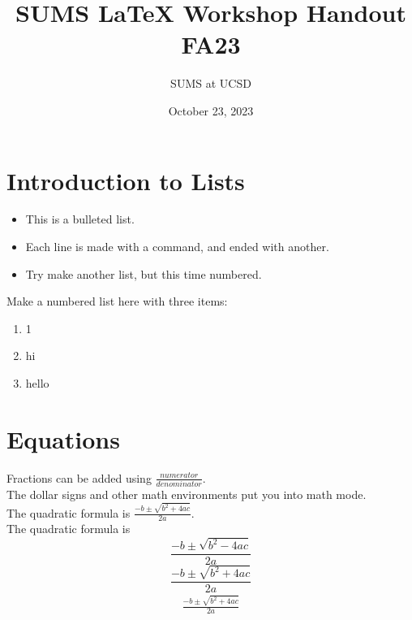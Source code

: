 \documentclass{article}
\title{SUMS \LaTeX\! Workshop Handout FA23}
\author{SUMS at UCSD}
\date{October 23, 2023}
\begin{document}
\maketitle

\section{Introduction to Lists}

\begin{itemize}
    \item This is a bulleted list.
    \item Each line is made with a command, and ended with another.
    \item Try make another list, but this time numbered.
\end{itemize}

Make a numbered list here with three items:
\begin{enumerate}
    \item 1
    \item hi
    \item hello
\end{enumerate}

\newpage
\section{Equations}

Fractions can be added using $\frac{numerator}{denominator}$. \\
The dollar signs and other math environments put you into math mode. 
\\[2\baselineskip]

The quadratic formula is $\frac{-b \pm \sqrt{b^2 + 4ac}}{2a}$.
\\[2\baselineskip]

The quadratic formula is 
\[ \frac{-b \pm \sqrt{b^2 - 4ac}}{2a} \]
\begin{equation}
    \frac{-b \pm \sqrt{b^2 + 4ac}}{2a}
\end{equation}
\begin{align}
    \frac{-b \pm \sqrt{b^2 + 4ac}}{2a}
\end{align}
\\[2\baselineskip]
\end{document}
